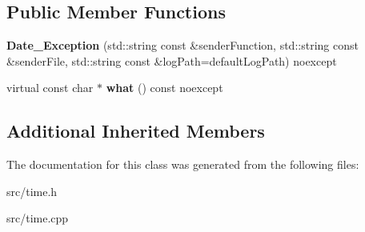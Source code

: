 \subsection*{Public Member Functions}
\begin{DoxyCompactItemize}
\item 
\hypertarget{classstb_1_1Date__Exception_ad78a26992f1916f6c5ca922d931df140}{{\bfseries Date\+\_\+\+Exception} (std\+::string const \&sender\+Function, std\+::string const \&sender\+File, std\+::string const \&log\+Path=default\+Log\+Path) noexcept}\label{classstb_1_1Date__Exception_ad78a26992f1916f6c5ca922d931df140}

\item 
\hypertarget{classstb_1_1Date__Exception_a02afd41586f2f2dcea55066223fde5df}{virtual const char $\ast$ {\bfseries what} () const noexcept}\label{classstb_1_1Date__Exception_a02afd41586f2f2dcea55066223fde5df}

\end{DoxyCompactItemize}
\subsection*{Additional Inherited Members}


The documentation for this class was generated from the following files\+:\begin{DoxyCompactItemize}
\item 
src/time.\+h\item 
src/time.\+cpp\end{DoxyCompactItemize}
